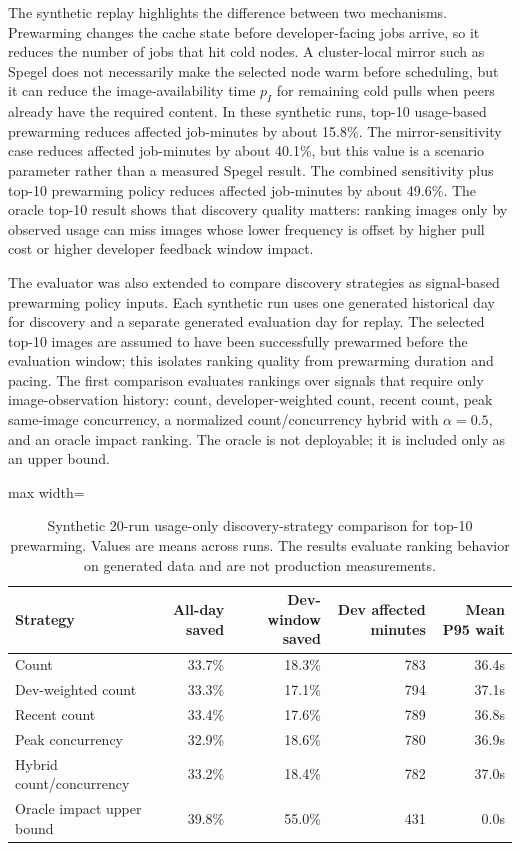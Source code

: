 \documentclass[11pt,a4paper]{article}
\begin{document}
The synthetic replay highlights the difference between two mechanisms. Prewarming changes the cache state before developer-facing jobs arrive, so it reduces the number of jobs that hit cold nodes. A cluster-local mirror such as Spegel does not necessarily make the selected node warm before scheduling, but it can reduce the image-availability time \(p_I\) for remaining cold pulls when peers already have the required content. In these synthetic runs, top-10 usage-based prewarming reduces affected job-minutes by about 15.8\%. The mirror-sensitivity case reduces affected job-minutes by about 40.1\%, but this value is a scenario parameter rather than a measured Spegel result. The combined sensitivity plus top-10 prewarming policy reduces affected job-minutes by about 49.6\%. The oracle top-10 result shows that discovery quality matters: ranking images only by observed usage can miss images whose lower frequency is offset by higher pull cost or higher developer feedback window impact.


The evaluator was also extended to compare discovery strategies as signal-based prewarming policy inputs. Each synthetic run uses one generated historical day for discovery and a separate generated evaluation day for replay. The selected top-10 images are assumed to have been successfully prewarmed before the evaluation window; this isolates ranking quality from prewarming duration and pacing. The first comparison evaluates rankings over signals that require only image-observation history: count, developer-weighted count, recent count, peak same-image concurrency, a normalized count/concurrency hybrid with \(\alpha=0.5\), and an oracle impact ranking. The oracle is not deployable; it is included only as an upper bound.

\begin{table}[H]
\centering
\caption{Synthetic 20-run usage-only discovery-strategy comparison for top-10 prewarming. Values are means across runs. The results evaluate ranking behavior on generated data and are not production measurements.}
\label{tab:synthetic-discovery-strategy-results}
\scriptsize
\begin{adjustbox}{max width=\linewidth}
\begin{tabular}{lrrrr}
\toprule
Strategy & All-day saved & Dev-window saved & Dev affected minutes & Mean P95 wait \\
\midrule
Count & 33.7\% & 18.3\% & 783 & 36.4s \\
Dev-weighted count & 33.3\% & 17.1\% & 794 & 37.1s \\
Recent count & 33.4\% & 17.6\% & 789 & 36.8s \\
Peak concurrency & 32.9\% & 18.6\% & 780 & 36.9s \\
Hybrid count/concurrency & 33.2\% & 18.4\% & 782 & 37.0s \\
Oracle impact upper bound & 39.8\% & 55.0\% & 431 & 0.0s \\
\bottomrule
\end{tabular}
\end{adjustbox}
\end{table}
\end{document}
